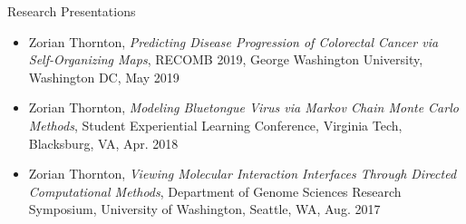 \documentclass{resume} %
\begin{document}

\begin{rSection}{Research Presentations}
\begin{itemize}

    \item Zorian Thornton, \textit{Predicting Disease Progression of Colorectal Cancer via Self-Organizing Maps}, RECOMB 2019, George Washington University, Washington DC, May 2019

    \item Zorian Thornton, \textit{Modeling Bluetongue Virus via Markov Chain Monte Carlo Methods}, Student Experiential Learning Conference, Virginia Tech, Blacksburg, VA, Apr. 2018

    \item Zorian Thornton, \textit{Viewing Molecular Interaction Interfaces Through Directed Computational Methods}, Department of Genome Sciences Research Symposium, University of Washington, Seattle, WA, Aug. 2017

\end{itemize}


\end{rSection}


\end{document}
